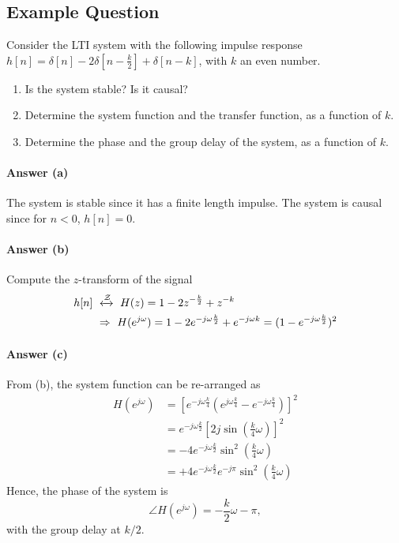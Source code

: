 \subsection{Example Question}
\begin{q}{}
    Consider the LTI system with the following impulse response $h[n]=\delta[n]-2\delta[n-\frac{k}{2}]+\delta[n-k]$, with $k$ an even number.
    \begin{enumerate}[label=(\alph*)]
        \item Is the system stable? Is it causal? 
        \item Determine the system function and the transfer function, as a function of $k$.
        \item Determine the phase and the group delay of the system, as a function of $k$.
    \end{enumerate}
    
    {\color{blue}
    \paragraph{Answer (a)}
    The system is stable since it has a finite length impulse. The system is causal since for $n<0$, $h[n] = 0$.
    
    \paragraph{Answer (b)}
    Compute the $z$-transform of the signal
    \begin{align*}
        h[n] \ & \xleftrightarrow[]{\mathcal{Z}} \ H(z) = 1 - 2z^{-\frac{k}{2}} + z^{-k} \\
        & \Rightarrow \ H(e^{j\omega}) = 1 - 2e^{-j\omega \frac{k}{2}} + e^{-j\omega k} = ( 1 - e^{-j\omega \frac{k}{2}} )^2 
    \end{align*}
    \color{blue}
    \paragraph{Answer (c)}
    From (b), the system function can be re-arranged as
    \begin{align*}
        H(e^{j\omega}) 
        &= [e^{-j\omega\frac{k}{4}} (e^{j\omega\frac{k}{4}} - e^{-j\omega\frac{k}{4}})]^2 \\
        & = e^{-j\omega\frac{k}{2}} \left[2j\sin \left(\frac{k}{4}\omega \right) \right]^2 \\
        & = -4e^{-j\omega\frac{k}{2}} \sin^2 \left(\frac{k}{4}\omega\right) \\
        & = +4e^{-j\omega\frac{k}{2}}e^{-j\pi} \sin^2 \left(\frac{k}{4}\omega\right)
    \end{align*}
    Hence, the phase of the system is
    \[
        \angle H(e^{j\omega}) = -\frac{k}{2} \omega - \pi,
    \]
    with the group delay at $k/2$.
    }
\end{q}




